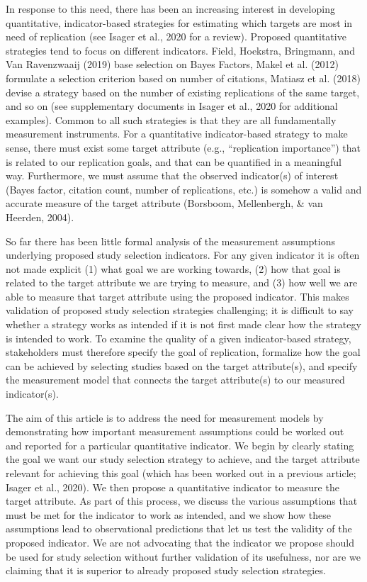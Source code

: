 \documentclass[
  english,
  jou,floatsintext]{apa6}
\begin{document}
In response to this need, there has been an increasing interest in developing quantitative, indicator-based strategies for estimating which targets are most in need of replication (see Isager et al., 2020 for a review). Proposed quantitative strategies tend to focus on different indicators. Field, Hoekstra, Bringmann, and Van Ravenzwaaij (2019) base selection on Bayes Factors, Makel et al. (2012) formulate a selection criterion based on number of citations, Matiasz et al. (2018) devise a strategy based on the number of existing replications of the same target, and so on (see supplementary documents in Isager et al., 2020 for additional examples). Common to all such strategies is that they are all fundamentally measurement instruments. For a quantitative indicator-based strategy to make sense, there must exist some target attribute (e.g., ``replication importance'') that is related to our replication goals, and that can be quantified in a meaningful way. Furthermore, we must assume that the observed indicator(s) of interest (Bayes factor, citation count, number of replications, etc.) is somehow a valid and accurate measure of the target attribute (Borsboom, Mellenbergh, \& van Heerden, 2004).

So far there has been little formal analysis of the measurement assumptions underlying proposed study selection indicators. For any given indicator it is often not made explicit (1) what goal we are working towards, (2) how that goal is related to the target attribute we are trying to measure, and (3) how well we are able to measure that target attribute using the proposed indicator. This makes validation of proposed study selection strategies challenging; it is difficult to say whether a strategy works as intended if it is not first made clear how the strategy is intended to work. To examine the quality of a given indicator-based strategy, stakeholders must therefore specify the goal of replication, formalize how the goal can be achieved by selecting studies based on the target attribute(s), and specify the measurement model that connects the target attribute(s) to our measured indicator(s).

The aim of this article is to address the need for measurement models by demonstrating how important measurement assumptions could be worked out and reported for a particular quantitative indicator. We begin by clearly stating the goal we want our study selection strategy to achieve, and the target attribute relevant for achieving this goal (which has been worked out in a previous article; Isager et al., 2020). We then propose a quantitative indicator to measure the target attribute. As part of this process, we discuss the various assumptions that must be met for the indicator to work as intended, and we show how these assumptions lead to observational predictions that let us test the validity of the proposed indicator. We are not advocating that the indicator we propose should be used for study selection without further validation of its usefulness, nor are we claiming that it is superior to already proposed study selection strategies.
\end{document}
